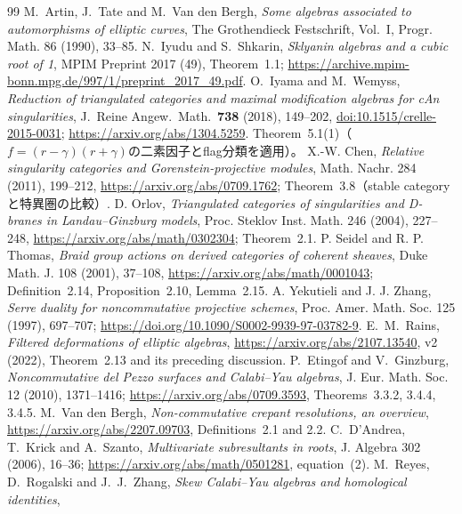 \documentclass[11pt,a4paper]{ltjsarticle}
\begin{document}
\begin{thebibliography}{99}
M.~Artin, J.~Tate and M.~Van den Bergh,
\emph{Some algebras associated to automorphisms of elliptic curves},
The Grothendieck Festschrift, Vol.~I, Progr. Math. 86 (1990), 33--85.
N.~Iyudu and S.~Shkarin, \emph{Sklyanin algebras and a cubic root of 1},
MPIM Preprint 2017 (49), Theorem~1.1;
\url{https://archive.mpim-bonn.mpg.de/997/1/preprint_2017_49.pdf}.
 O.~Iyama and M.~Wemyss,
\emph{Reduction of triangulated categories and maximal modification
algebras for cAn singularities},
J.\ Reine Angew.\ Math.\ \textbf{738} (2018), 149--202,
\href{https://doi.org/10.1515/crelle-2015-0031}{doi:10.1515/crelle-2015-0031};
\url{https://arxiv.org/abs/1304.5259}.
Theorem~5.1(1)（$f=(r-\gamma)(r+\gamma)$の二素因子とflag分類を適用）。
X.-W. Chen, \emph{Relative singularity categories and
Gorenstein-projective modules}, Math. Nachr. 284 (2011), 199--212,
\url{https://arxiv.org/abs/0709.1762};
Theorem~3.8（stable categoryと特異圏の比較）.
D. Orlov, \emph{Triangulated categories of singularities and
D-branes in Landau--Ginzburg models},
Proc. Steklov Inst. Math. 246 (2004), 227--248,
\url{https://arxiv.org/abs/math/0302304}; Theorem~2.1.
P. Seidel and R. P. Thomas,
\emph{Braid group actions on derived categories of coherent sheaves},
Duke Math. J. 108 (2001), 37--108,
\url{https://arxiv.org/abs/math/0001043};
Definition~2.14, Proposition~2.10, Lemma~2.15.
A. Yekutieli and J. J. Zhang,
\emph{Serre duality for noncommutative projective schemes},
Proc. Amer. Math. Soc. 125 (1997), 697--707;
\url{https://doi.org/10.1090/S0002-9939-97-03782-9}.
E.~M.~Rains, \emph{Filtered deformations of elliptic algebras},
\url{https://arxiv.org/abs/2107.13540}, v2 (2022), Theorem~2.13 and its preceding discussion.
P.~Etingof and V.~Ginzburg,
\emph{Noncommutative del Pezzo surfaces and Calabi--Yau algebras},
J. Eur. Math. Soc. 12 (2010), 1371--1416;
\url{https://arxiv.org/abs/0709.3593}, Theorems~3.3.2, 3.4.4, 3.4.5.
M.~Van den Bergh, \emph{Non-commutative crepant resolutions, an overview},
\url{https://arxiv.org/abs/2207.09703}, Definitions~2.1 and 2.2.
C.~D'Andrea, T.~Krick and A.~Szanto,
\emph{Multivariate subresultants in roots}, J. Algebra 302 (2006), 16--36;
\url{https://arxiv.org/abs/math/0501281}, equation~(2).
M.~Reyes, D.~Rogalski and J.~J.~Zhang,
\emph{Skew Calabi--Yau algebras and homological identities},

\end{thebibliography}
\end{document}
